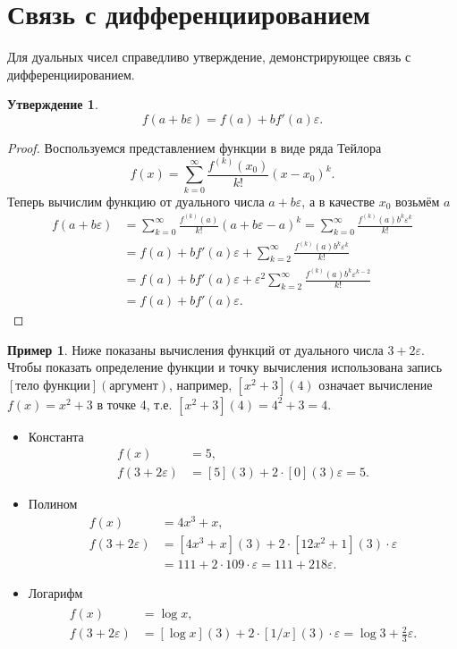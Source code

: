\documentclass{article}
\newcommand{\dual}{\varepsilon}
\newtheorem{statement}{Утверждение}
\theoremstyle{definition}
\newtheorem{example}{Пример}
\begin{document}
\section{Связь с дифференциированием}
Для дуальных чисел справедливо утверждение, демонстрирующее связь с дифференциированием.
\begin{statement}
\begin{equation}\label{eq:funcofdual}
  f(a + b\dual) = f(a) + b f'(a)\dual
.\end{equation}
\end{statement}
\begin{proof}
Воспользуемся представлением функции в виде ряда Тейлора
\[
  f(x) = \sum_{k=0}^{\infty} \frac{f^{(k)}(x_0)}{k!} (x - x_0)^k
.\]
Теперь вычислим функцию от дуального числа $a + b\dual$, а в качестве $x_0$ возьмём $a$
\begin{align*}
  f(a + b\dual) &= \sum_{k=0}^{\infty} \frac{f^{(k)}(a)}{k!} (a + b\dual - a)^k
  = \sum_{k=0}^{\infty} \frac{f^{(k)}(a) b^k \dual^k}{k!}
  \\
  &= f(a) + b f'(a) \dual + \sum_{k=2}^\infty \frac{f^{(k)}(a) b^k \dual^k}{k!}
  \\
  &= f(a) + b f'(a) \dual + \dual^2 \sum_{k=2}^\infty \frac{f^{(k)}(a) b^k \dual^{k-2}}{k!}
  \\
  &= f(a) + b f'(a) \dual
.\end{align*}
\end{proof}

\begin{example}
Ниже показаны вычисления функций от дуального числа $3 + 2\dual$. Чтобы показать определение функции и точку вычисления использована запись $[\text{тело функции}](\text{аргумент})$, например, $[x^2 + 3](4)$ означает вычисление $f(x) = x^2 + 3$ в точке 4, т.е. $[x^2 + 3](4) = 4^2 + 3 = 4$.
\begin{itemize}

\item Константа
\begin{align*}
  f(x) &= 5,
  \\
  f(3 + 2\dual) &= [5](3) + 2 \cdot [0](3) \dual = 5
.\end{align*}

\item Полином
\begin{align*}
  f(x) &= 4x^3 + x,
  \\
  f(3 + 2 \dual) &= [4 x^3 + x](3) + 2 \cdot [12 x^2 + 1](3) \cdot \dual
  \\
  &= 111 + 2 \cdot 109 \cdot \dual = 111 + 218 \dual
.\end{align*}

\item Логарифм
\begin{align}\label{eq:example_log}
\begin{split}
  f(x) &= \log x,
  \\
  f(3 + 2 \dual) &= [\log x](3) + 2 \cdot [1/x](3) \cdot \dual = \log 3 + \frac{2}{3} \dual
.\end{split}
\end{align}
\end{itemize}
\end{example}
\end{document}
